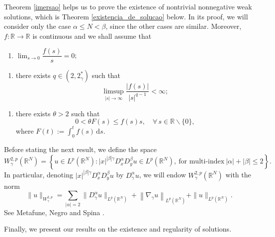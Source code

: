 \documentclass[12pt]{amsart}
\newcommand{\R}{\mathbb{R}}
\begin{document}
Theorem \ref{imersao} helps us to prove the existence of nontrivial nonnegative weak solutions, which is Theorem \ref{existencia_de_solucao} below. In its proof, we will consider only the case $\alpha\leq N < \beta$, since the other cases are similar. Moreover, \(f : \mathbb{R} \to \mathbb{R}\) is continuous and we shall assume that

\vspace{0,2cm}

\begin{enumerate}[label=($f_1$),ref=$(f_1)$]
	\item \label{(f_1)} 
    \(\displaystyle\lim_{s\to 0}\dfrac{f(s)}{s}=0\);
\end{enumerate}

\begin{enumerate}[label=($f_2$),ref=$(f_2)$]
	\item \label{(f_2)} there exists $q \in\left(2,2_\gamma^*\right)$ such that	
	$$
	\limsup _{|s| \rightarrow\infty} \frac{|f(s)|}{|s|^{q-1}}<\infty;
	$$
\end{enumerate}

\begin{enumerate}[label=($f_3$),ref=$(f_3)$]
	\item \label{(f_3)} there exists $\theta>2$ such that
	$$
	0<\theta F(s) \leq f(s) s, \quad \forall \, s \in \mathbb{R} \backslash\{0\},
	$$	
	where $F(t):=\int_0^t f(s) \,\mathrm{d} s$.
\end{enumerate}


Before stating the next result, we define the space 
$$W_\gamma^{2, p}(\R^N)  =\left\{u \in L^p\left(\mathbb{R}^N\right): |x|^{|\beta|\gamma}D^\alpha_x D^\beta_yu \in L^p\left(\mathbb{R}^N\right), \ \mbox{for multi-index} \ |\alpha|+|\beta|\leq 2\right\} .$$
In particular, denoting $|x|^{|\beta|\gamma}D^\alpha_x D^\beta_y u$ by $ D_\gamma^\alpha u $, we will endow $W_\gamma^{2, p}(\R^N)$ with the norm
\begin{equation}\label{w2norm}
	\|u\|_{W^{2,p}_\gamma}  =  \sum_{|\alpha|=2 } \|D_\gamma^\alpha u \|_{L^p(\R^N)} +\left\|\nabla_\gamma u\right\|_{L^p(\R^N)} + \| u\|_{L^p(\R^N)}. 
\end{equation}
See  Metafune, Negro and Spina \cite{Me-N-Spi-20}.


Finally, we present our results on the existence and regularity of solutions.
\end{document}
